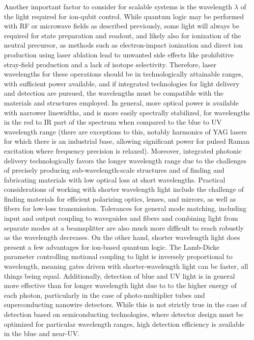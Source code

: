 \documentclass[%
12pt,
 amsmath,amssymb,
]{revtex4-2}
\begin{document}
Another important factor to consider for scalable systems is the wavelength $\lambda$ of the light required for ion-qubit control.  While quantum logic may be performed with RF or microwave fields as described previously, some light will always be required for state preparation and readout, and likely also for ionization of the neutral precursor, as methods such as electron-impact ionization and direct ion production using laser ablation lead to unwanted side effects like prohibitive stray-field production and a lack of isotope selectivity.  Therefore, laser wavelengths for these operations should be in technologically attainable ranges, with sufficient power available, and if integrated technologies for light delivery and detection are pursued, the wavelengths must be compatible with the materials and structures employed.  In general, more optical power is available with narrower linewidths, and is more easily spectrally stabilized, for wavelengths in the red to IR part of the spectrum when compared to the blue to UV wavelength range (there are exceptions to this, notably harmonics of YAG lasers for which there is an industrial base, allowing significant power for pulsed Raman excitation where frequency precision is relaxed).  Moreover, integrated photonic delivery technologically favors the longer wavelength range due to the challenges of precisely producing sub-wavelength-scale structures and of finding and fabricating materials with low optical loss at short wavelengths.  Practical considerations of working with shorter wavelength light include the challenge of finding materials for efficient polarizing optics, lenses, and mirrors, as well as fibers for low-loss transmission.  Tolerances for general mode matching, including input and output coupling to waveguides and fibers and combining light from separate modes at a beamsplitter are also much more difficult to reach robustly as the wavelength decreases.  On the other hand, shorter wavelength light does present a few advantages for ion-based quantum logic.  The Lamb-Dicke parameter controlling motional coupling to light is inversely proportional to wavelength, meaning gates driven with shorter-wavelength light can be faster, all things being equal.  Additionally, detection of blue and UV light is in general more effective than for longer wavelength light due to to the higher energy of each photon, particularly in the case of photo-multiplier tubes and superconducting nanowire detectors.  While this is not strictly true in the case of detection based on semiconducting technologies, where detector design must be optimized for particular wavelength ranges, high detection efficiency is available in the blue and near-UV.
\end{document}
